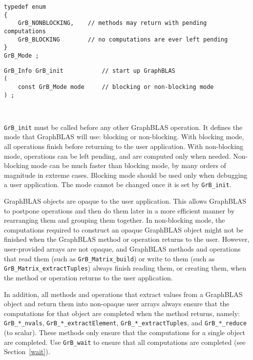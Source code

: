 \documentclass[12pt]{article}
\begin{document}
\begin{mdframed}[userdefinedwidth=6in]
{\footnotesize
\begin{verbatim}
typedef enum
{
    GrB_NONBLOCKING,    // methods may return with pending computations
    GrB_BLOCKING        // no computations are ever left pending
}
GrB_Mode ;
\end{verbatim}
}\end{mdframed}

\begin{mdframed}[userdefinedwidth=6in]
{\footnotesize
\begin{verbatim}
GrB_Info GrB_init           // start up GraphBLAS
(
    const GrB_Mode mode     // blocking or non-blocking mode
) ;
\end{verbatim}
}\end{mdframed}

\hypertarget{link:init}{\mbox{ }}%
\verb'GrB_init' must be called before any other GraphBLAS operation.  It
defines the mode that GraphBLAS will use:  blocking or non-blocking.  With
blocking mode, all operations finish before returning to the user application.
With non-blocking mode, operations can be left pending, and are computed only
when needed.  Non-blocking mode can be much faster than blocking mode, by many
orders of magnitude in extreme cases.  Blocking mode should be used only when
debugging a user application.  The mode cannot be changed once it is set by
\verb'GrB_init'.

GraphBLAS objects are opaque to the user application.  This allows GraphBLAS to
postpone operations and then do them later in a more efficient manner by
rearranging them and grouping them together.  In non-blocking mode, the
computations required to construct an opaque GraphBLAS object might not be
finished when the GraphBLAS method or operation returns to the user.  However,
user-provided arrays are not opaque, and GraphBLAS methods and operations that
read them (such as \verb'GrB_Matrix_build') or write to them (such as
\verb'GrB_Matrix_extractTuples') always finish reading them, or creating them,
when the method or operation returns to the user application.

In addition, all methods and operations that extract values from a GraphBLAS
object and return them into non-opaque user arrays always ensure that the
computations for that object are completed when the method returns, namely:
\verb'GrB_*_nvals', \verb'GrB_*_extractElement', \verb'GrB_*_extractTuples',
and \verb'GrB_*_reduce' (to scalar).  These methods only ensure that the
computations for a single object are completed.  Use \verb'GrB_wait'
to ensure that all computations are completed (see Section~\ref{wait}).
\end{document}
